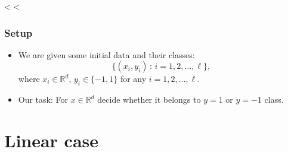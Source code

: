 \documentclass{beamer}
\begin{document}
<%
<%
\begin{frame}[c]\frametitle{Setup}
	\begin{itemize}
		\item We are given some initial data and their classes:
			\[
				\{(x_i,y_i) \,:\, i=1,2,\ldots,\ell\},
			\]
			where $x_i \in \mathbb{R}^d$, $y_i \in \{-1,1\}$ for any $i=1,2,\ldots,\ell$.
		\vfill
		\item Our task: For $x\in\mathbb{R}^d$ decide whether it belongs to $y=1$ or $y=-1$ class.
	\end{itemize}
\end{frame}

\section{Linear case}
\label{sec:linear_case}
\end{document}
